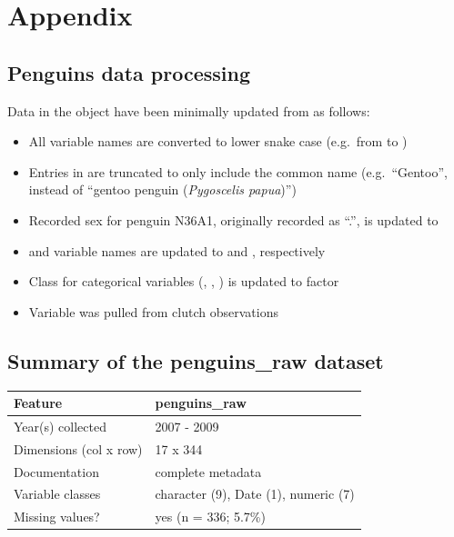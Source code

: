 \hypertarget{appendix}{%
\section*{Appendix}\label{appendix}}

\hypertarget{penguins-data-processing}{%
\subsection{Penguins data processing}\label{penguins-data-processing}}

Data in the  object have been minimally updated from
 as follows:

\begin{itemize}
\tightlist
\item
  All variable names are converted to lower snake case (e.g.~from
   to )
\item
  Entries in  are truncated to only include the common
  name (e.g.~``Gentoo'', instead of ``gentoo penguin (\emph{Pygoscelis
  papua})'')
\item
  Recorded sex for penguin N36A1, originally recorded as ``.'', is
  updated to 
\item
   and  variable names are
  updated to  and ,
  respectively
\item
  Class for categorical variables (, ,
  ) is updated to factor
\item
  Variable  was pulled from clutch observations
\end{itemize}

\hypertarget{summary-of-the-penguins_raw-dataset}{%
\subsection{\texorpdfstring{Summary of the \textbf{penguins\_raw}
dataset}{Summary of the penguins\_raw dataset}}\label{summary-of-the-penguins_raw-dataset}}

\begin{Schunk}

\begin{tabular}{ll}
\toprule
Feature & penguins\_raw\\
\midrule
Year(s) collected & 2007 - 2009\\
Dimensions (col x row) & 17 x 344\\
Documentation & complete metadata\\
Variable classes & character (9), Date (1), numeric (7)\\
Missing values? & yes (n = 336; 5.7\%)\\
\bottomrule
\end{tabular}

\end{Schunk}


